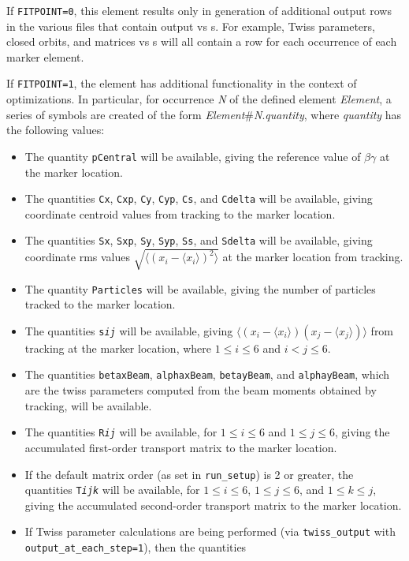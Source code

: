 If {\tt FITPOINT=0}, this element results only in generation of additional output rows in the various 
files that contain output vs s.  For example, Twiss parameters, closed orbits, and matrices vs s will
all contain a row for each occurrence of  each marker element.

If {\tt FITPOINT=1}, the element has additional functionality in the context of optimizations.  In particular,
for occurrence {\em N} of the defined element {\em Element}, a series of symbols are created of the
form {\em Element}\#{\em N}.{\em quantity}, where {\em quantity} has the following values:
\begin{itemize}
\item The quantity {\tt pCentral} will be available, giving the reference value of $\beta\gamma$ at the marker location.
\item The quantities {\tt Cx}, {\tt Cxp}, {\tt Cy}, {\tt Cyp}, {\tt Cs}, and {\tt Cdelta} will be available,
 giving coordinate centroid values from tracking to the marker location.
\item The quantities {\tt Sx}, {\tt Sxp}, {\tt Sy}, {\tt Syp}, {\tt Ss}, and {\tt Sdelta} will be available,
 giving coordinate rms values $\sqrt{\langle (x_i - \langle x_i \rangle)^2\rangle}$ at the marker location from tracking.
\item The quantity {\tt Particles} will be available, giving the number of particles tracked to the marker location.
\item The quantities {\tt s{\em i}{\em j}} will be available, giving $\langle ( x_i -\langle x_i\rangle)( x_j - \langle x_j \rangle)\rangle$
 from tracking at the marker location, where $1\leq i\leq 6$ and $i<j\leq 6$.
\item The quantities {\tt betaxBeam}, {\tt alphaxBeam}, {\tt betayBeam}, and {\tt alphayBeam}, which are the twiss parameters computed
      from the beam moments obtained by tracking, will be available.
\item The quantities {\tt R{\em i}{\em j}} will be available, for $1\leq i \leq 6$ and $1\leq j \leq 6$,
  giving the accumulated first-order transport matrix to the marker location.
\item If the default matrix order (as set in {\tt run\_setup}) is 2 or greater, the quantities {\tt T{\em i}{\em j}{\em k}} 
  will be available, for $1\leq i \leq 6$, $1\leq j \leq 6$, and $1\leq k \leq j$,
  giving the accumulated second-order transport matrix to the marker location.
\item If Twiss parameter calculations are being performed (via {\tt twiss\_output} with {\tt output\_at\_each\_step=1}), then the quantities

\end{itemize}
